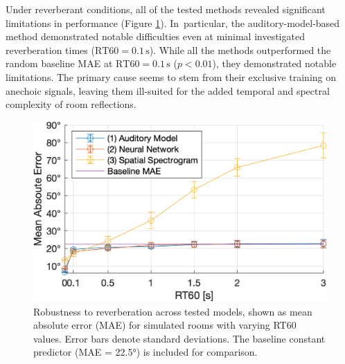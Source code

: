 Under reverberant conditions, all of the tested methods revealed significant limitations in performance (Figure \ref{fig:rt}). In~particular, the auditory-model-based method demonstrated notable difficulties even at minimal investigated reverberation times ($\mathrm{RT}{60}=0.1\,\mathrm{s}$). While all the methods outperformed the random baseline MAE at $\mathrm{RT}{60}=0.1\,\mathrm{s}$ ($p<0.01$), they demonstrated notable limitations. The primary cause seems to stem from their exclusive training on anechoic signals, leaving them ill-suited for the added temporal and spectral complexity of room reflections.

\begin{figure}[htbp]
	\begin{center}
		\includegraphics[width=1.0\linewidth]{img/mae_rt.png} 
	\end{center}
	\caption{Robustness to reverberation across tested models, shown as mean absolute error (MAE) for simulated rooms with varying RT60 values. Error bars denote standard deviations. The baseline constant predictor (MAE = 22.5°) is included for comparison.} \label{fig:rt}
\end{figure}



